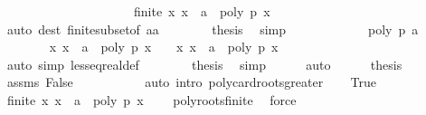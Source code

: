 \begin{isabellebody}
\ \ \ \ \ \ \ \ \ \ \ \ \ \ \ \ \ \ \ \ \ {\isachardoublequoteopen}{\isasymnot}finite\ {\isacharbraceleft}x{\isachardot}\ x\ {\isachargreater}\ a\ {\isasymand}\ poly\ p\ x\ {\isacharequal}\ {}{\isacharbraceright}{\isachardoublequoteclose}\ \isanewline
\ \ \ \ \ \ \ \ \ \ \isamarkupfalse%
\ {\isacharparenleft}auto\ dest{\isacharcolon}\ finite{\isacharunderscore}subset{\isacharbrackleft}of\ {\isachardoublequoteopen}{\isacharbraceleft}a{\isacharless}{\isachardot}{\isachardot}{\isacharless}a{\isacharplus}{}{\isacharbraceright}{\isachardoublequoteclose}{\isacharbrackright}{\isacharparenright}\isanewline
\ \ \ \ \ \ \isamarkupfalse%
\ {\isacharquery}thesis\ \isamarkupfalse%
\ simp\isanewline
\ \ \ \ \isamarkupfalse%
\isanewline
\ \ \ \ \ \ \isamarkupfalse%
\ {\isachardoublequoteopen}poly\ p\ a\ {\isasymnoteq}\ {}{\isachardoublequoteclose}\isanewline
\ \ \ \ \ \ \isamarkupfalse%
\ {\isachardoublequoteopen}{\isacharbraceleft}x{\isachardot}\ x\ {\isasymge}\ a\ {\isasymand}\ poly\ p\ x\ {\isacharequal}\ {}{\isacharbraceright}\ {\isacharequal}\ {\isacharbraceleft}x{\isachardot}\ x\ {\isachargreater}\ a\ {\isasymand}\ poly\ p\ x\ {\isacharequal}\ {}{\isacharbraceright}{\isachardoublequoteclose}\ \isanewline
\ \ \ \ \ \ \ \ \ \ \isamarkupfalse%
\ {\isacharparenleft}auto\ simp{\isacharcolon}\ less{\isacharunderscore}eq{\isacharunderscore}real{\isacharunderscore}def{\isacharparenright}\isanewline
\ \ \ \ \ \ \isamarkupfalse%
\ {\isacharquery}thesis\ \isamarkupfalse%
\ simp\isanewline
\ \ \ \ \isamarkupfalse%
\ auto\isanewline
\ \ \ \ \isamarkupfalse%
\ {\isacharquery}thesis\ \isamarkupfalse%
\ assms\ False\ \isanewline
\ \ \ \ \ \ \ \ \isamarkupfalse%
\ {\isacharparenleft}auto\ intro{\isacharcolon}\ poly{\isacharunderscore}card{\isacharunderscore}roots{\isacharunderscore}greater{\isacharparenright}\isanewline
{}\isamarkupfalse%
\isanewline
\ \ \isamarkupfalse%
\ True\isanewline
\ \ \ \ \isamarkupfalse%
\ {\isachardoublequoteopen}finite\ {\isacharbraceleft}x{\isachardot}\ x\ {\isachargreater}\ a\ {\isasymand}\ poly\ p\ x\ {\isacharequal}\ {}{\isacharbraceright}{\isachardoublequoteclose}\ \isamarkupfalse%
\ poly{\isacharunderscore}roots{\isacharunderscore}finite\ \isamarkupfalse%
\ force\isanewline
\ \ \ \ \isamarkupfalse%

\end{isabellebody}
